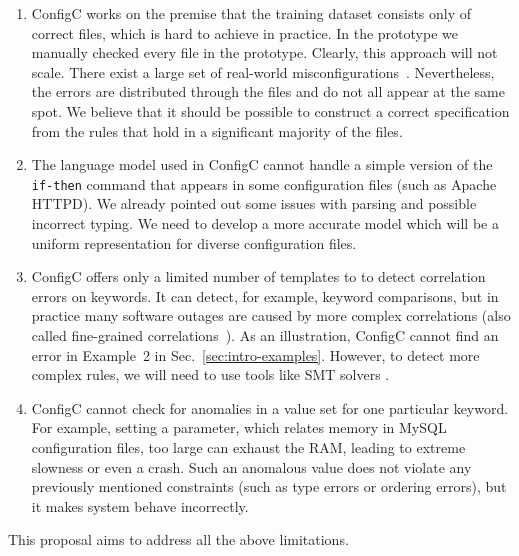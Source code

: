 \begin{enumerate}

\item ConfigC works on the premise that the training dataset consists 
only of correct files, which is hard to achieve in practice. In the 
prototype we manually checked every file in the prototype. Clearly, this 
approach will not scale. There exist a large set of 
real-world misconfigurations~\cite{configdataset}. Nevertheless, the 
errors are distributed through the files and do not all appear at the 
same spot. We believe that it should be possible to construct a correct
specification from the rules that hold in a significant majority of the 
files.

\item The language model used in ConfigC cannot handle a simple version of 
the {\tt {if-then}} command that appears in some configuration
files (such as Apache HTTPD). We already pointed out some issues with 
parsing and possible incorrect typing. We need to develop a more 
accurate model which will be a uniform representation for diverse
  configuration files.

\item ConfigC offers only a limited number of templates to to detect 
correlation errors on keywords. It can detect, for example, 
keyword comparisons, but in practice many software outages are 
caused by more complex correlations (also called
  fine-grained correlations~\cite{correlation}). As an illustration,
  ConfigC cannot find an error in Example~2 in 
Sec.~\ref{sec:intro-examples}. However, to detect more complex rules, we will need to use tools like SMT solvers \cite{z3, cvc4}.


\item ConfigC cannot check for anomalies in a value set for one particular keyword. For example,
  setting a parameter, which relates memory in MySQL configuration 
  files, too large can exhaust the RAM, leading to extreme 
  slowness or even a crash. Such an anomalous value does not violate any
  previously mentioned constraints (such as type errors or ordering errors), but 
  it makes system behave incorrectly.

\end{enumerate}

This proposal aims to address all the above limitations. 
